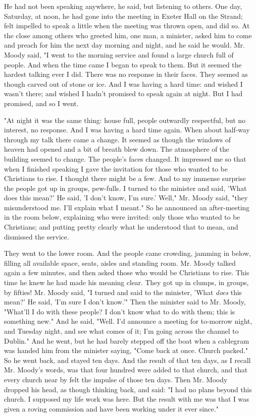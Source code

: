 He had not been speaking anywhere, he said, but listening to others. One
day, Saturday, at noon, he had gone into the meeting in Exeter Hall on the
Strand; felt impelled to speak a little when the meeting was thrown open,
and did so. At the close among others who greeted him, one man, a
minister, asked him to come and preach for him the next day morning and
night, and he said he would. Mr. Moody said, "I went to the morning
service and found a large church full of people. And when the time came I
began to speak to them. But it seemed the hardest talking ever I did.
There was no response in their faces. They seemed as though carved out of
stone or ice. And I was having a hard time: and wished I wasn't there; and
wished I hadn't promised to speak again at night. But I had promised, and
so I went.

"At night it was the same thing: house full, people outwardly respectful,
but no interest, no response. And I was having a hard time again. When
about half-way through my talk there came a change. It seemed as though
the windows of heaven had opened and a bit of breath blew down. The
atmosphere of the building seemed to change. The people's faces changed.
It impressed me so that when I finished speaking I gave the invitation for
those who wanted to be Christians to rise. I thought there might be a few.
And to my immense surprise the people got up in groups, pew-fulls. I
turned to the minister and said, 'What does this mean?' He said, 'I don't
know, I'm sure.' Well," Mr. Moody said, "they misunderstood me. I'll
explain what I meant." So he announced an after-meeting in the room below,
explaining who were invited: only those who wanted to be Christians; and
putting pretty clearly what he understood that to mean, and dismissed the
service.

They went to the lower room. And the people came crowding, jamming in
below, filling all available space, seats, aisles and standing room. Mr.
Moody talked again a few minutes, and then asked those who would be
Christians to rise. This time he knew he had made his meaning clear. They
got up in clumps, in groups, by fifties! Mr. Moody said, "I turned and
said to the minister, 'What \textit{does} this mean?' He said, 'I'm sure I don't
know.'" Then the minister said to Mr. Moody, "What'll I do with these
people? I don't know what to do with them; this is something new." And he
said, "Well. I'd announce a meeting for to-morrow night, and Tuesday
night, and see what comes of it; I'm going across the channel to Dublin."
And he went, but he had barely stepped off the boat when a cablegram was
handed him from the minister saying, "Come back at once. Church packed."
So he went back, and stayed ten days. And the result of that ten days, as
I recall Mr. Moody's words, was that four hundred were added to that
church, and that every church near by felt the impulse of those ten days.
Then Mr. Moody dropped his head, as though thinking back, and said: "I had
no plans beyond this church. I supposed my life work was here. But the
result with me was that I was given a roving commission and have been
working under it ever since."

